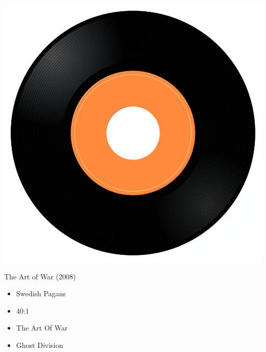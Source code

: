 \begin{minipage}[t]{0.25\textwidth}
\captionsetup{type=figure}
\includegraphics[width=\textwidth]{Images/cover.png}
\caption*{The Art of War (2008)}
\end{minipage}
\begin{minipage}[t]{0.25\textwidth}\vspace{0pt}
\begin{itemize}[nosep,leftmargin=1em,labelwidth=*,align=left]
	\setlength{\itemsep}{0pt}
	\item Swedish Pagans
	\item 40:1
	\item The Art Of War
	\item Ghost Division
\end{itemize}
\end{minipage}
